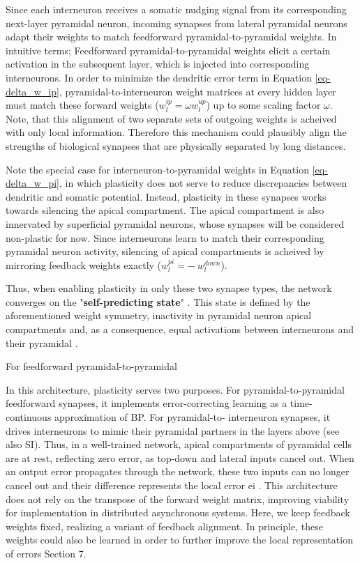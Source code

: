 Since each interneuron receives a somatic nudging signal from its corresponding next-layer pyramidal neuron, incoming
synapses from lateral pyramidal neurons adapt their weights to match feedforward pyramidal-to-pyramidal weights. In
intuitive terms; Feedforward pyramidal-to-pyramidal weights elicit a certain activation in the subsequent layer, which
is injected into corresponding interneurons. In order to minimize the dendritic error term in Equation
\ref{eq-delta_w_ip}, pyramidal-to-interneuron weight matrices at every hidden layer must match these forward weights
($w_l^{ip} = \omega w_l^{up}$) up to some scaling factor $\omega$.
Note, that this alignment of two separate sets of outgoing weights is acheived with only local information. Therefore 
this mechanism could plausibly align the strengths of biological synapses that are physically separated by long 
distances. \newline

Note the special case for interneuron-to-pyramidal weights in Equation \ref{eq-delta_w_pi}, in which plasticity does not serve to reduce
discrepancies between dendritic and somatic potential. Instead, plasticity in these synapses works towards silencing the
apical compartment. The apical compartment is also innervated by superficial pyramidal neurons, whose synapses will
be considered non-plastic for now. Since interneurons learn to match their corresponding pyramidal neuron activity,
silencing of apical compartments is acheived by mirroring feedback weights exactly ($w_l^{pi} = -\ w_l^{down}$).\newline

Thus, when enabling plasticity in only these two synapse types, the network converges on the
"\textbf{self-predicting state}" \citep{sacramento2018dendritic}.
This state is defined by the aforementioned weight symmetry, inactivity in pyramidal neuron apical compartments and,
as a consequence, equal activations between interneurons and their pyramidal .




For feedforward pyramidal-to-pyramidal

In this architecture, plasticity serves two purposes. For pyramidal-to-pyramidal feedforward synapses,
it implements error-correcting learning as a time-continuous approximation of BP. For pyramidal-to-
interneuron synapses, it drives interneurons to mimic their pyramidal partners in the layers above (see
also SI). Thus, in a well-trained network, apical compartments of pyramidal cells are at rest, reflecting
zero error, as top-down and lateral inputs cancel out. When an output error propagates through the
network, these two inputs can no longer cancel out and their difference represents the local error ei .
This architecture does not rely on the transpose of the forward weight matrix, improving viability for
implementation in distributed asynchronous systems. Here, we keep feedback weights fixed, realizing
a variant of feedback alignment. In principle, these weights could also be learned in order to further
improve the local representation of errors Section 7.



